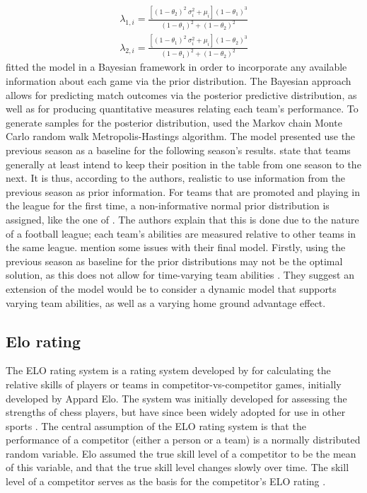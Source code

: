 \begin{equation}
    \begin{aligned}
        \lambda_{1, i} = \frac{[(1 - \theta_{2})^{2}\ \sigma_{i}^{2} + \mu_{i}] (1 - \theta_{1})^{3}}{(1 - \theta_{1})^{2} + (1 - \theta_{2})^{2}} \\
        \lambda_{2, i} = \frac{[(1 - \theta_{1})^{2}\ \sigma_{i}^{2} + \mu_{i}] (1 - \theta_{2})^{3}}{(1 - \theta_{1})^{2} + (1 - \theta_{2})^{2}}
    \end{aligned}    
    \label{eq:shahtahmassebi-moyeed-lambda}
\end{equation}
\citet{bib:shahtahmassebi-moyeed-2016} fitted the model in a Bayesian framework in order to incorporate any available information about each game via the prior distribution. The Bayesian approach allows for predicting match outcomes via the posterior predictive distribution, as well as for producing quantitative measures relating each team's performance. To generate samples for the posterior distribution, \citet{bib:shahtahmassebi-moyeed-2016} used the Markov chain Monte Carlo random walk Metropolis-Hastings algorithm. The model presented use the previous season as a baseline for the following season's results. \citet{bib:shahtahmassebi-moyeed-2016} state that teams generally at least intend to keep their position in the table from one season to the next. It is thus, according to the authors, realistic to use information from the previous season as prior information. For teams that are promoted and playing in the league for the first time, a non-informative normal prior distribution is assigned, like the one of \citet{bib:karlis-ntzoufras-2008}. The authors explain that this is done due to the nature of a football league; each team's abilities are measured relative to other teams in the same league. \citet{bib:shahtahmassebi-moyeed-2016} mention some issues with their final model. Firstly, using the previous season as baseline for the prior distributions may not be the optimal solution, as this does not allow for time-varying team abilities \citep{bib:shahtahmassebi-moyeed-2016}. They suggest an extension of the model would be to consider a dynamic model that supports varying team abilities, as well as a varying home ground advantage effect.

\subsection{Elo rating}

The ELO rating system is a rating system developed by for calculating the relative skills of players or teams in competitor-vs-competitor games, initially developed by Appard Elo. The system was initially developed for assessing the strengths of chess players, but have since been widely adopted for use in other sports \citep{bib:chessbase-2007}. The central assumption of the ELO rating system is that the performance of a competitor (either a person or a team) is a normally distributed random variable. Elo assumed the true skill level of a competitor to be the mean of this variable, and that the true skill level changes slowly over time. The skill level of a competitor serves as the basis for the competitor's ELO rating \citep{bib:chessbase-2007}.

